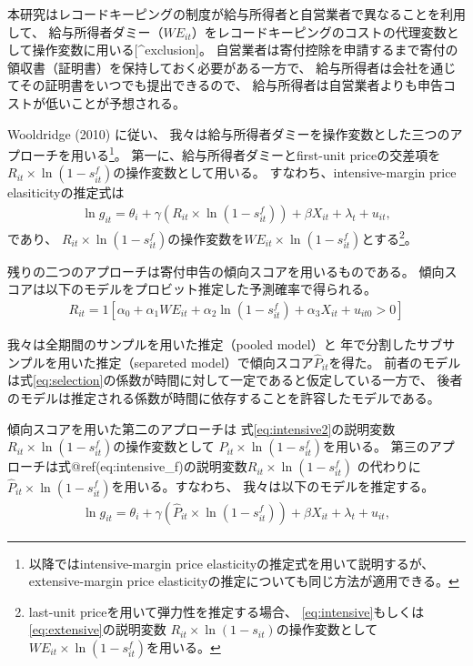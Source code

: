 \documentclass[
  11pt,
  a4paper,
]{article}
\begin{document}
本研究はレコードキーピングの制度が給与所得者と自営業者で異なることを利用して、
給与所得者ダミー（\(WE_{it}\)）をレコードキーピングのコストの代理変数として操作変数に用いる{[}\^{}exclusion{]}。
自営業者は寄付控除を申請するまで寄付の領収書（証明書）を保持しておく必要がある一方で、
給与所得者は会社を通じてその証明書をいつでも提出できるので、
給与所得者は自営業者よりも申告コストが低いことが予想される。

Wooldridge (2010) に従い、
我々は給与所得者ダミーを操作変数とした三つのアプローチを用いる\footnote{以降ではintensive-margin price elasticityの推定式を用いて説明するが、
  extensive-margin price elasticityの推定についても同じ方法が適用できる。}。
第一に、給与所得者ダミーとfirst-unit priceの交差項を
\(R_{it} \times \ln (1 - s^f_{it})\)の操作変数として用いる。
すなわち、intensive-margin price elasiticityの推定式は
\begin{align}
  \ln g_{it} = \theta_i + \gamma (R_{it} \times \ln (1 - s^f_{it}))
    + \beta X_{it} + \lambda_t + u_{it}, \label{eq:intensive2}
\end{align}
であり、
\(R_{it} \times \ln (1 - s^f_{it})\)の操作変数を\(WE_{it} \times \ln(1 - s^f_{it})\)とする\footnote{last-unit priceを用いて弾力性を推定する場合、
  \eqref{eq:intensive}もしくは\eqref{eq:extensive}の説明変数
  \(R_{it} \times \ln (1 - s_{it})\)の操作変数として
  \(WE_{it} \times \ln(1 - s^f_{it})\)を用いる。}。

残りの二つのアプローチは寄付申告の傾向スコアを用いるものである。
傾向スコアは以下のモデルをプロビット推定した予測確率で得られる。
\begin{align}
  R_{it} = 1[
    \alpha_0 + \alpha_1 WE_{it} + \alpha_2 \ln(1 - s^f_{it})
    + \alpha_3 X_{it} + u_{it0} > 0
  ] \label{eq:selection}
\end{align}

我々は全期間のサンプルを用いた推定（pooled model）と
年で分割したサブサンプルを用いた推定（separeted model）で傾向スコア\(\hat{P}_{it}\)を得た。
前者のモデルは式\eqref{eq:selection}の係数が時間に対して一定であると仮定している一方で、
後者のモデルは推定される係数が時間に依存することを許容したモデルである。

傾向スコアを用いた第二のアプローチは
式\eqref{eq:intensive2}の説明変数\(R_{it} \times \ln (1 - s^f_{it})\)の操作変数として
\(\hat{P}_{it} \times \ln (1 - s^f_{it})\)を用いる。
第三のアプローチは式@ref(eq:intensive\_f)の説明変数\(R_{it} \times \ln (1 - s^f_{it})\)
の代わりに\(\hat{P}_{it} \times \ln (1 - s^f_{it})\)を用いる。すなわち、
我々は以下のモデルを推定する。
\begin{align}
  \ln g_{it} = \theta_i + \gamma (\hat{P}_{it} \times \ln (1 - s^f_{it}))
    + \beta X_{it} + \lambda_t + u_{it}, \label{eq:intensive3}
\end{align}
\end{document}
